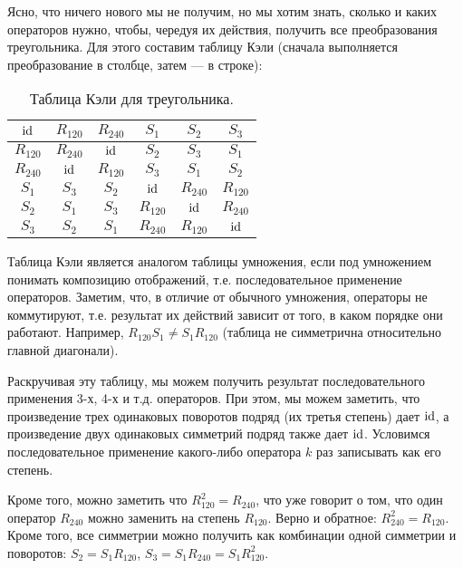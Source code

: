Ясно, что ничего нового мы не получим, но мы хотим знать, сколько и каких операторов нужно, чтобы, чередуя их действия, получить все преобразования треугольника. Для этого составим таблицу Кэли (сначала выполняется преобразование в столбце, затем --- в строке):

\begin{table}[htb!]\begin{center}
\begin{tabular}{c|c|c|c|c|c|}
$\mathrm{id}$     & $R_{120}$ & $R_{240}$ & $S_1$ & $S_2$ & $S_3$ \\
\hline
$R_{120}$ & $R_{240}$ & $\mathrm{id}$     & $S_2$ & $S_3$ & $S_1$ \\
\hline
$R_{240}$ & $\mathrm{id}$     & $R_{120}$ & $S_3$ & $S_1$ & $S_2$ \\
\hline
$S_1$     & $S_3$     & $S_2$     & $\mathrm{id}$ & $R_{240}$ & $R_{120}$ \\
\hline
$S_2$     & $S_1$     & $S_3$     & $R_{120}$ & $\mathrm{id}$ & $R_{240}$ \\
\hline
$S_3$     & $S_2$     & $S_1$     & $R_{240}$ & $R_{120}$ & $\mathrm{id}$\\
\hline
\end{tabular}
\caption{Таблица Кэли для треугольника.}\label{triangle}
\end{center}\end{table}

Таблица Кэли является аналогом таблицы умножения, если под умножением понимать композицию отображений, т.е. последовательное применение операторов. Заметим, что, в отличие от обычного умножения, операторы не коммутируют, т.е. результат их действий зависит от того, в каком порядке они работают. Например, $R_{120}S_1\ne S_1R_{120}$ (таблица не симметрична относительно главной диагонали).

Раскручивая эту таблицу, мы можем получить результат последовательного применения 3-х, 4-х и т.д. операторов. При этом, мы можем заметить, что произведение трех одинаковых поворотов подряд (их третья степень) дает $\mathrm{id}$, а произведение двух одинаковых симметрий подряд также дает $\mathrm{id}$. Условимся последовательное применение какого-либо оператора $k$ раз записывать как его степень.

Кроме того, можно заметить что $R_{120}^2=R_{240}$, что уже говорит о том, что один оператор $R_{240}$ можно заменить на степень $R_{120}$. Верно и обратное: $R_{240}^2=R_{120}$. Кроме того, все симметрии можно получить как комбинации одной симметрии и поворотов: $S_2=S_1R_{120}$, $S_3=S_1R_{240}=S_1R_{120}^2$.

